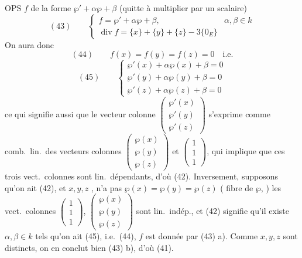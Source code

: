 \documentclass[11pt,a4paper]{article}
\begin{document}
OPS $f$ de la forme $\wp' + \alpha\wp + \beta$
(quitte à multiplier par un scalaire)
\[
  (43) \qquad
  \begin{cases}
    f = \wp' + \alpha \wp + \beta , & \alpha, \beta \in k \\
    \operatorname{div} f = \{x\} + \{y\} + \{z\} - 3\{0_E\}
  \end{cases}
\]
On aura donc
\[
  (44) \qquad f(x) = f(y) = f(z) = 0 \quad\text{i.e.}
\]
\[
  (45) \qquad
  \begin{cases}
    \wp'(x) + \alpha \wp(x) + \beta = 0 \\
    \wp'(y) + \alpha \wp(y) + \beta = 0 \\
    \wp'(z) + \alpha \wp(z) + \beta = 0
  \end{cases}
\]
ce qui signifie aussi que le vecteur colonne
$\begin{pmatrix} \wp'(x) \\ \wp'(y) \\ \wp'(z) \end{pmatrix}$ s'exprime comme
comb.\ lin.\ des vecteurs colonnes
$\begin{pmatrix} \wp(x) \\ \wp(y) \\ \wp(z) \end{pmatrix}$ et
$\begin{pmatrix} 1 \\ 1 \\ 1 \end{pmatrix}$,  qui implique que ces trois
vect.\ colonnes sont lin.\ dépendants, d'où (42). Inversement, supposons qu'on ait
(42), et $x, y, z$ \struck{\ill{}} ,
\struck{\ill{} \ill{} \ill{} \ill{}}  n'a pas
$\wp(x) = \wp(y) = \wp(z)$ ( \ill{} \ill{} fibre de $\wp$, \ill{}
 ) \add{\ill{}} les vect.\ colonnes
$\begin{pmatrix} 1 \\ 1 \\ 1 \end{pmatrix}$,
$\begin{pmatrix} \wp(x) \\ \wp(y) \\ \wp(z) \end{pmatrix}$ sont lin.\ indép.,
et (42) signifie qu'il existe $\alpha, \beta \in k$ tels qu'on ait (45), i.e.\
(44),  $f$ est donnée par (43) a).  Comme $x, y, z$ sont
distincts, on en conclut bien (43) b), d'où (41).
\end{document}
